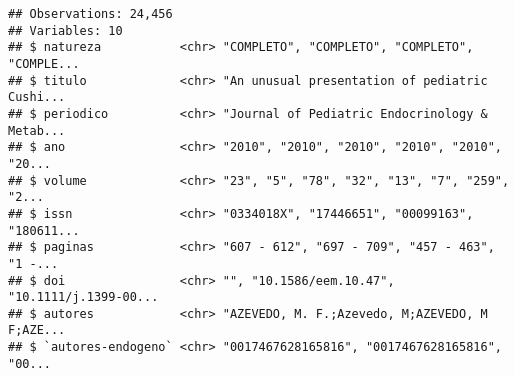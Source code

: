 \documentclass[]{article}
\newenvironment{Shaded}{\begin{snugshade}}{\end{snugshade}}
\newcommand{\KeywordTok}[1]{\textcolor[rgb]{0.13,0.29,0.53}{\textbf{#1}}}
\newcommand{\DataTypeTok}[1]{\textcolor[rgb]{0.13,0.29,0.53}{#1}}
\newcommand{\CharTok}[1]{\textcolor[rgb]{0.31,0.60,0.02}{#1}}
\newcommand{\StringTok}[1]{\textcolor[rgb]{0.31,0.60,0.02}{#1}}
\newcommand{\CommentTok}[1]{\textcolor[rgb]{0.56,0.35,0.01}{\textit{#1}}}
\newcommand{\OperatorTok}[1]{\textcolor[rgb]{0.81,0.36,0.00}{\textbf{#1}}}
\newcommand{\NormalTok}[1]{#1}
\begin{document}
\begin{Shaded}
\end{Shaded}

\begin{verbatim}
## Observations: 24,456
## Variables: 10
## $ natureza           <chr> "COMPLETO", "COMPLETO", "COMPLETO", "COMPLE...
## $ titulo             <chr> "An unusual presentation of pediatric Cushi...
## $ periodico          <chr> "Journal of Pediatric Endocrinology & Metab...
## $ ano                <chr> "2010", "2010", "2010", "2010", "2010", "20...
## $ volume             <chr> "23", "5", "78", "32", "13", "7", "259", "2...
## $ issn               <chr> "0334018X", "17446651", "00099163", "180611...
## $ paginas            <chr> "607 - 612", "697 - 709", "457 - 463", "1 -...
## $ doi                <chr> "", "10.1586/eem.10.47", "10.1111/j.1399-00...
## $ autores            <chr> "AZEVEDO, M. F.;Azevedo, M;AZEVEDO, M F;AZE...
## $ `autores-endogeno` <chr> "0017467628165816", "0017467628165816", "00...
\end{verbatim}
\end{document}
